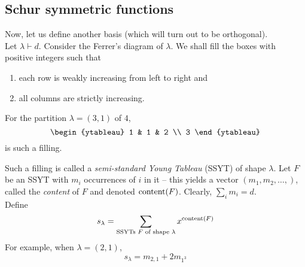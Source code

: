 \subsection{Schur symmetric functions}

	Now, let us define another basis (which will turn out to be orthogonal).\\
	Let $\lambda \vdash d$. Consider the Ferrer's diagram of $\lambda$. We shall fill the boxes with positive integers such that
	\begin{enumerate}
		\item each row is weakly increasing from left to right and
		\item all columns are strictly increasing.
	\end{enumerate}

	\begin{fex}
		For the partition $\lambda = (3,1)$ of $4$,
		\[
		\begin{ytableau}
			1 & 1 & 2 \\
			3
		\end{ytableau}
		\]
		is such a filling.
	\end{fex}
	Such a filling is called a \emph{semi-standard Young Tableau} (SSYT) of shape $\lambda$. Let $F$ be an SSYT with $m_i$ occurrences of $i$ in it -- this yields a vector $(m_1,m_2,\ldots,)$, called the \emph{content} of $F$ and denoted $\operatorname{content}(F)$. Clearly, $\sum_i m_i = d$.\\
	Define
	\[ s_\lambda = \sum_{\text{SSYTs $F$ of shape $\lambda$}} x^{\operatorname{content}(F)} \]
	For example, when $\lambda = (2,1)$,
	\[ s_\lambda = m_{2,1} + 2 m_{1^3} \]

